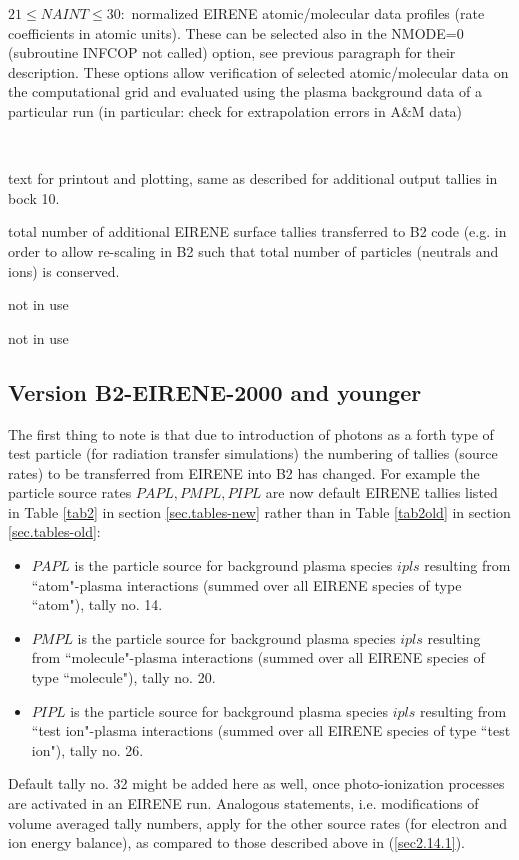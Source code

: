 \begin{list}{ }{}
$21 \le NAINT \le 30 :$
normalized EIRENE atomic/molecular data profiles (rate coefficients in atomic units). These can be selected also in the
NMODE=0 (subroutine INFCOP not called) option, see previous paragraph for their description.
These options allow verification of selected atomic/molecular data on the computational grid and evaluated using
the plasma background data of a particular run (in particular: check for extrapolation errors in A$\&$M data)

\item[{\bf TXTPLS, TXTPSP, TXTPUN }]~

text for printout and plotting, same as described for additional output tallies in bock 10.
\item[{\bf NAOTB }]
total number of additional EIRENE surface tallies transferred to
B2 code (e.g. in order to allow re-scaling in B2 such that total
number of particles (neutrals and ions) is conserved.
\item[{\bf NAOTS }]
not in use
\item[{\bf NAOTT }]
not in use
\end{list}
\subsection{Version B2-EIRENE-2000 and younger} \label{sec2.14.2}
\medskip
The first thing to note is that due to introduction of photons as a forth type of test particle (for radiation transfer simulations) the numbering of tallies
(source rates) to be transferred from EIRENE into B2 has changed.
For example the particle source rates $PAPL, PMPL,  PIPL$ are now default EIRENE tallies
listed in Table \ref{tab2} in section \ref{sec.tables-new}
rather than in Table \ref{tab2old} in section \ref{sec.tables-old}:
 \begin{itemize}
 \item
 $PAPL$ is the particle source for background plasma species $ipls$ resulting from ``atom"-plasma interactions (summed over all EIRENE species of type ``atom"), tally no. 14.
 \item
 $PMPL$ is the particle source for background plasma species $ipls$ resulting from ``molecule"-plasma interactions (summed over all EIRENE species of type ``molecule"), tally no. 20.
 \item
 $PIPL$ is the particle source for background plasma species $ipls$ resulting from ``test ion"-plasma interactions (summed over all EIRENE species of type ``test ion"), tally no. 26.
 \end{itemize}
Default tally no. 32 might be added here as well, once photo-ionization processes are activated in an EIRENE run.
Analogous statements, i.e. modifications of volume averaged tally numbers,
apply for the other source rates (for electron and ion energy balance), as compared
to those described above in (\ref{sec2.14.1}).

